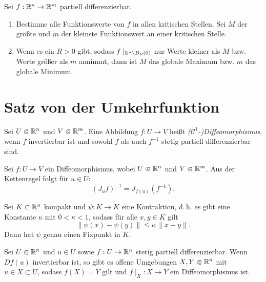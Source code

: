 \documentclass{cheat-sheet}
\begin{document}
\begin{samepage}

\begin{strat}
Sei $f : \mathbb{R}^n \to \mathbb{R}^m$ partiell differenzierbar.
\begin{enumerate}
  \item Bestimme alle Funktionswerte von $f$ in allen kritischen Stellen. Sei $M$ der größte und $m$ der kleinste Funktionswert an einer kritischen Stelle.
  \item Wenn es ein $R > 0$ gibt, sodass $f\mid_{\mathbb{R}^n \backslash B_R(0)}$ nur Werte kleiner als $M$ bzw. Werte größer als $m$ annimmt, dann ist $M$ das globale Maximum bzw. $m$ das globale Minimum.
\end{enumerate}
\end{strat}


\section{Satz von der Umkehrfunktion}

\end{samepage}

\begin{defn}
Sei $U \opn \R^n$ und $V \opn \R^m$. Eine Abbildung $f : U \to V$ heißt \emph{($\mathcal{C}^1$-)Diffeomorphismus}, wenn $f$ invertierbar ist und sowohl $f$ als auch $f^{-1}$ stetig partiell differenzierbar sind.
\end{defn}

\begin{bem}
Sei $f : U \to V$ ein Diffeomorphismus, wobei $U \opn \R^n$ und $V \opn \R^m$. Aus der Kettenregel folgt für $u \in U$:
\[ (J_u f)^{-1} = J_{f(u)}(f^{-1}). \]
\end{bem}

\begin{satz}
Sei $K \subset \mathbb{R}^n$ kompakt und $\psi : K \to K$ eine Kontraktion, d.\,h. es gibt eine Konstante $\kappa$ mit $0 < \kappa < 1$, sodass für alle $x, y \in K$ gilt
\[ \| \psi(x) - \psi(y) \| \le \kappa\,\| x - y \|. \]
Dann hat $\psi$ genau einen Fixpunkt in $K$.
\end{satz}

\begin{satz}
Sei $U \opn \R^n$ und $u \in U$ sowie $f : U \to \mathbb{R}^n$ stetig partiell differenzierbar. Wenn $D f(u)$ invertierbar ist, so gibt es offene Umgebungen $X, Y \opn \R^n$ mit $u \in X \subset U$, sodass $f(X) = Y$ gilt und $f\mid_X : X \to Y$ ein Diffeomorphismus ist.
\end{satz}
\end{document}
